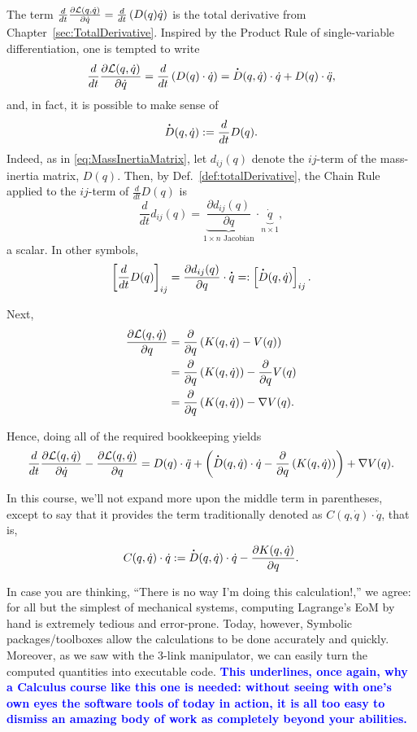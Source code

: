 The term $\frac{d}{dt} \frac{ \partial {\cal L}(q, \dot{q})}{\partial\dot{q}} = \frac{d}{dt}  \left( D(q) \dot{q} \right)$ is the total derivative from Chapter~\ref{sec:TotalDerivative}. Inspired by the Product Rule of single-variable differentiation, one is tempted to write
$$\frac{d}{dt} \frac{ \partial {\cal L}(q, \dot{q})}{\partial\dot{q}} = \frac{d}{dt} \left(D(q) \cdot  \dot{q} \right) = \customdot{D}(q, \dot{q}) \cdot \dot{q} + D(q) \cdot \ddot{q},$$
and, in fact, it is possible to make sense of 
$$ \customdot{D}(q, \dot{q}) := \frac{d}{dt} D(q).$$
Indeed, as in \eqref{eq:MassInertiaMatrix}, let $d_{ij}(q)$ denote the $ij$-term of the mass-inertia matrix, $D(q)$. Then, by Def.~\ref{def:totalDerivative}, the Chain Rule applied to the $ij$-term of $\frac{d}{dt} D(q)$ is
$$\frac{d}{dt} d_{ij}(q) = \underbrace{\frac{ \partial {d}_{ij}(q)}{\partial q}}_{1 \times n \text{ Jacobian}} \cdot \underbrace{\dot{q}}_{n \times 1},$$
a scalar. In other symbols,
$$ \left[ \frac{d}{dt} D(q)  \right]_{ij}=\frac{ \partial {d}_{ij}(q)}{\partial q} \cdot \customdot{q} =: \left[ \customdot{D}(q, \dot{q}) \right]_{ij}.$$

Next, 
\begin{align*}
 \frac{ \partial {\cal L}(q, \dot{q})}{\partial q} & =  \frac{ \partial }{\partial q} \left(K(q, \dot{q})  - V(q)\right) \\
 &=\frac{ \partial }{\partial q} \left(K(q, \dot{q}) \right)  - \frac{ \partial }{\partial q} V(q) \\
 &= \frac{ \partial }{\partial q} \left(K(q, \dot{q}) \right) - \nabla V(q).
\end{align*}

Hence, doing all of the required bookkeeping yields
$$  \frac{d}{dt} \frac{ \partial {\cal L}(q, \dot{q})}{\partial\dot{q}} - \frac{ \partial {\cal L}(q, \dot{q})}{\partial q} = D(q) \cdot \ddot{q} + \left( \customdot{D}(q, \dot{q}) \cdot \dot{q} -  \frac{ \partial }{\partial q} \left(K(q, \dot{q}) \right) \right) + \nabla V(q).$$ 

In this course, we'll not expand more upon the middle term in parentheses, except to say that it provides the term traditionally denoted as $C(q, \dot q) \cdot \dot{q}$, that is,
$$C(q, \dot{q}) \cdot \dot{q} :=\customdot{D}(q, \dot{q}) \cdot \dot{q} - \frac{ \partial K(q, \dot{q})}{\partial q}.$$

In case you are thinking, ``There is no way I'm doing this calculation!,'' we agree: for all but the simplest of mechanical systems, computing Lagrange's EoM by hand is extremely tedious and error-prone. Today, however, Symbolic packages/toolboxes allow the calculations to be done accurately and quickly. Moreover, as we saw with the 3-link manipulator, we can easily turn the computed quantities into executable code. \textcolor{blue}{\bf This underlines, once again, why a Calculus course like this one is needed: without seeing with one's own eyes the software tools of today in action, it is all too easy to dismiss an amazing body of work as completely beyond your abilities. }

